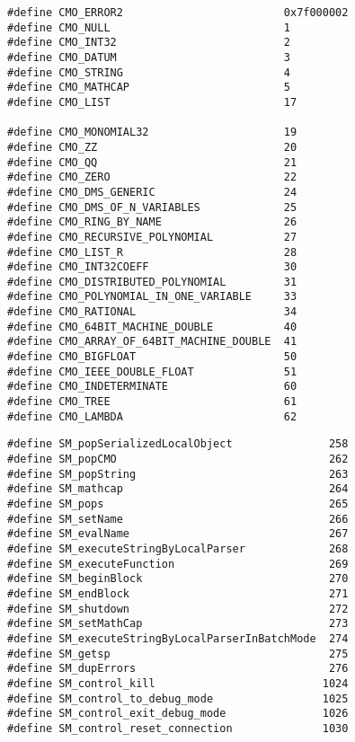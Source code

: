 \documentclass{slides}
\begin{document}
{\footnotesize
\begin{verbatim}
#define CMO_ERROR2                         0x7f000002
#define CMO_NULL                           1
#define CMO_INT32                          2
#define CMO_DATUM                          3
#define CMO_STRING                         4
#define CMO_MATHCAP                        5
#define CMO_LIST                           17

#define CMO_MONOMIAL32                     19
#define CMO_ZZ                             20
#define CMO_QQ                             21
#define CMO_ZERO                           22
#define CMO_DMS_GENERIC                    24
#define CMO_DMS_OF_N_VARIABLES             25
#define CMO_RING_BY_NAME                   26
#define CMO_RECURSIVE_POLYNOMIAL           27
#define CMO_LIST_R                         28
#define CMO_INT32COEFF                     30
#define CMO_DISTRIBUTED_POLYNOMIAL         31
#define CMO_POLYNOMIAL_IN_ONE_VARIABLE     33
#define CMO_RATIONAL                       34
#define CMO_64BIT_MACHINE_DOUBLE           40
#define CMO_ARRAY_OF_64BIT_MACHINE_DOUBLE  41
#define CMO_BIGFLOAT                       50
#define CMO_IEEE_DOUBLE_FLOAT              51
#define CMO_INDETERMINATE                  60
#define CMO_TREE                           61
#define CMO_LAMBDA                         62
\end{verbatim} }

{\footnotesize
\begin{verbatim}
#define SM_popSerializedLocalObject               258
#define SM_popCMO                                 262
#define SM_popString                              263
#define SM_mathcap                                264
#define SM_pops                                   265
#define SM_setName                                266
#define SM_evalName                               267
#define SM_executeStringByLocalParser             268
#define SM_executeFunction                        269
#define SM_beginBlock                             270
#define SM_endBlock                               271
#define SM_shutdown                               272
#define SM_setMathCap                             273
#define SM_executeStringByLocalParserInBatchMode  274
#define SM_getsp                                  275
#define SM_dupErrors                              276
#define SM_control_kill                          1024
#define SM_control_to_debug_mode                 1025
#define SM_control_exit_debug_mode               1026
#define SM_control_reset_connection              1030
\end{verbatim} }
\newpage
\end{document}

